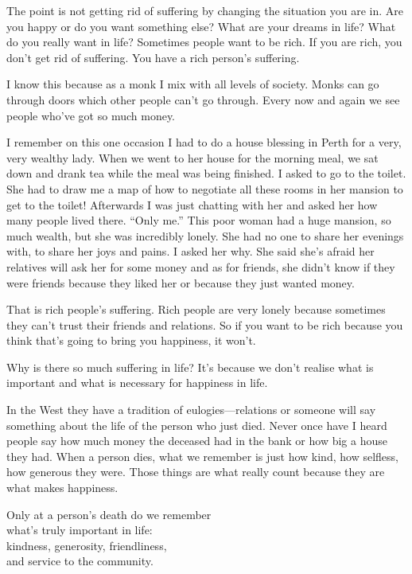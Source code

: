 \documentclass[12pt, openany]{book}
\newenvironment{aphorism}%
{%
\begin{center}\begin{itshape}
}%
{\end{itshape}\end{center}
}%
\begin{document}
The point is not getting rid of suffering by changing the situation you are in. Are you happy or do you want something else? What are your dreams in life? What do you really want in life? Sometimes people want to be rich. If you are rich, you don’t get rid of suffering. You have a rich person’s suffering. 

I know this because as a monk I mix with all levels of society. Monks can go through doors which other people can’t go through. Every now and again we see people who’ve got so much money. 

I remember on this one occasion I had to do a house blessing in Perth for a very, very wealthy lady. When we went to her house for the morning meal, we sat down and drank tea while the meal was being finished. I asked to go to the toilet. She had to draw me a map of how to negotiate all these rooms in her mansion to get to the toilet! Afterwards I was just chatting with her and asked her how many people lived there. “Only me.” This poor woman had a huge mansion, so much wealth, but she was incredibly lonely. She had no one to share her evenings with, to share her joys and pains. I asked her why. She said she’s afraid her relatives will ask her for some money and as for friends, she didn’t know if they were friends because they liked her or because they just wanted money. 

That is rich people’s suffering. Rich people are very lonely because sometimes they can’t trust their friends and relations. So if you want to be rich because you think that’s going to bring you happiness, it won’t. 

Why is there so much suffering in life? It’s because we don’t realise what is important and what is necessary for happiness in life. 

In the West they have a tradition of eulogies—relations or someone will say something about the life of the person who just died. Never once have I heard people say how much money the deceased had in the bank or how big a house they had. When a person dies, what we remember is just how kind, how selfless, how generous they were. Those things are what really count because they are what makes happiness. 

\begin{aphorism}
Only at a person’s death do we remember\\  
what’s truly important in life:\\ 
kindness, generosity, friendliness,\\  
and service to the community.
\end{aphorism}
\end{document}
